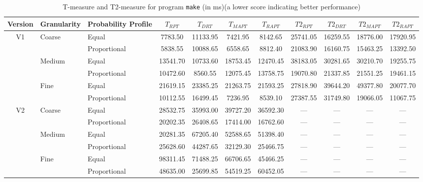 \documentclass[10pt,journal,cspaper,compsoc,onecolumn]{IEEEtran}
\begin{document}
\begin{table}
\caption{T-measure and T2-measure for program \texttt{make} (in ms)(a lower score indicating better performance)}
\label{tab:Tmake}
\centering
\begin{tabular}{|c|l|l|c|c|c|c|c|c|c|c|} \hline
Version	& Granularity	& Probability Profile	& $T_{RPT}$	& $T_{DRT}$	& $T_{MAPT}$	& $T_{RAPT}$	& $T2_{RPT}$	& $T2_{DRT}$	& $T2_{MAPT}$	 & $T2_{RAPT}$	\\ \hline
V1	& Coarse	& Equal	& 7783.50	& 11133.95	& 7421.95	& 8142.65	& 25741.05	& 16259.55	& 18776.00	& 17920.95	 \\ \cline{3-11}
	& 	& Proportional	& 5838.55	& 10088.65	& 6558.65	& 8812.40	& 21083.90	& 16160.75	& 15463.25	& 13392.50	 \\ \cline{2-11}
	& Medium	& Equal	& 13541.70	& 10733.60	& 18753.45	& 12470.45	& 38183.05	& 30281.65	& 30210.70	& 19255.75	 \\ \cline{3-11}
	& 	& Proportional	& 10472.60	& 8560.55	& 12075.45	& 13758.75	& 19070.80	& 21337.85	& 21551.25	& 19461.15	 \\ \cline{2-11}
	& Fine	& Equal	& 21619.15	& 23385.25	& 21263.75	& 21593.25	& 27818.90	& 39644.20	& 49377.80	& 20077.70	 \\ \cline{3-11}
	& 	& Proportional	& 10112.55	& 16499.45	& 7236.95	& 8539.10	& 27387.55	& 31749.80	& 19066.05	& 11067.75	 \\ \hline
V2	& Coarse	& Equal	& 28532.75	& 35993.00	& 39727.20	& 36592.30	& ---	& ---	& ---	& ---	 \\ \cline{3-11}
	& 	& Proportional	& 20202.35	& 26408.65	& 17414.00	& 16762.60	& ---	& ---	& ---	& ---	 \\ \cline{2-11}
	& Medium	& Equal	& 20281.35	& 67205.40	& 52588.65	& 51398.40	& ---	& ---	& ---	& ---	 \\ \cline{3-11}
	& 	& Proportional	& 25628.60	& 44287.65	& 32129.30	& 25466.75	& ---	& ---	& ---	& ---	 \\ \cline{2-11}
	& Fine	& Equal	& 98311.45	& 71488.25	& 66706.65	& 45466.25	& ---	& ---	& ---	& ---	 \\ \cline{3-11}
	& 	& Proportional	& 48635.00	& 25699.85	& 54519.25	& 60452.05	& ---	& ---	& ---	& ---	 \\ \hline
\end{tabular}
\end{table}
\end{document}
